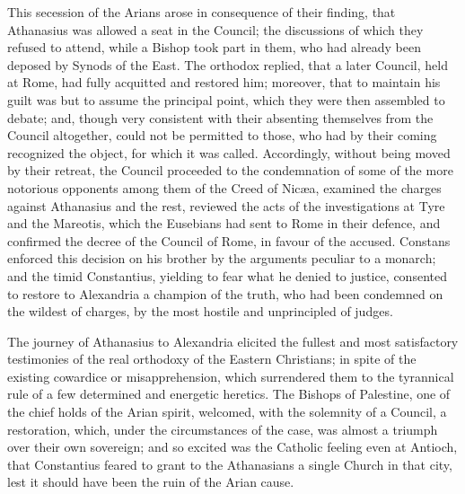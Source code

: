 This secession of the Arians arose in consequence of their finding,
that Athanasius was allowed a seat in the Council; the discussions of
which they refused to attend, while a Bishop took part in them, who
had already been deposed by Synods of the East. The orthodox replied,
that a later Council, held at Rome, had fully acquitted and
restored him; moreover, that to maintain his guilt was but to assume
the principal point, which they were then assembled to debate; and,
though very consistent with their absenting themselves from the
Council altogether, could not be permitted to those, who had by their
coming recognized the object, for which it was called. Accordingly,
without being moved by their retreat, the Council proceeded to the
condemnation of some of the more notorious opponents among them of the
Creed of Nicæa, examined the charges against Athanasius and the rest,
reviewed the acts of the investigations at Tyre and the Mareotis,
which the Eusebians had sent to Rome in their defence, and confirmed
the decree of the Council of Rome, in favour of the accused. Constans
enforced this decision on his brother by the arguments peculiar to a
monarch; and the timid Constantius, yielding to fear what he denied to
justice, consented to restore to Alexandria a champion of the truth,
who had been condemned on the wildest of charges, by the most hostile
and unprincipled of judges.

The journey of Athanasius to Alexandria elicited the fullest and
most satisfactory testimonies of the real orthodoxy of the Eastern
Christians; in spite of the existing cowardice or misapprehension,
which surrendered them to the tyrannical rule of a few determined and
energetic heretics. The Bishops of Palestine, one of the chief holds
of the Arian spirit, welcomed, with the solemnity of a Council, a
restoration, which, under the circumstances of the case, was almost a
triumph over their own sovereign; and so excited was the Catholic
feeling even at Antioch, that Constantius feared to grant to the
Athanasians a single Church in that city, lest it should have been the
ruin of the Arian cause.

